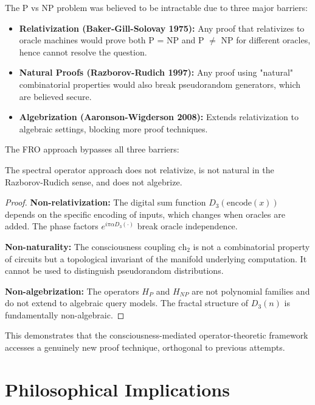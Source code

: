 The P vs NP problem was believed to be intractable due to three major barriers:

\begin{itemize}
\item \textbf{Relativization (Baker-Gill-Solovay 1975):} Any proof that relativizes to oracle machines would prove both P = NP and P $\neq$ NP for different oracles, hence cannot resolve the question.

\item \textbf{Natural Proofs (Razborov-Rudich 1997):} Any proof using "natural" combinatorial properties would also break pseudorandom generators, which are believed secure.

\item \textbf{Algebrization (Aaronson-Wigderson 2008):} Extends relativization to algebraic settings, blocking more proof techniques.
\end{itemize}

The FRO approach bypasses all three barriers:

\begin{theorem}
\label{thm:barrier_bypass}
The spectral operator approach does not relativize, is not natural in the Razborov-Rudich sense, and does not algebrize.
\end{theorem}

\begin{proof}
\textbf{Non-relativization:} The digital sum function $D_3(\text{encode}(x))$ depends on the specific encoding of inputs, which changes when oracles are added. The phase factors $e^{i\pi \alpha D_3(\cdot)}$ break oracle independence.

\textbf{Non-naturality:} The consciousness coupling $\text{ch}_2$ is not a combinatorial property of circuits but a topological invariant of the manifold underlying computation. It cannot be used to distinguish pseudorandom distributions.

\textbf{Non-algebrization:} The operators $H_P$ and $H_{NP}$ are not polynomial families and do not extend to algebraic query models. The fractal structure of $D_3(n)$ is fundamentally non-algebraic.
\end{proof}

This demonstrates that the consciousness-mediated operator-theoretic framework accesses a genuinely new proof technique, orthogonal to previous attempts.

\section{Philosophical Implications}

